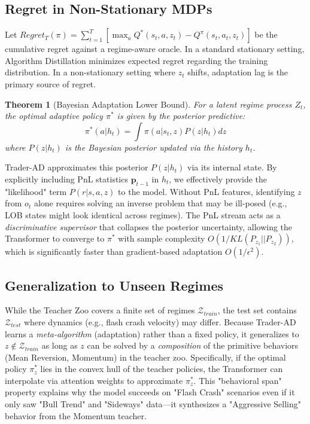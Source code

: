 \documentclass{article}
\newtheorem{theorem}{Theorem}
\begin{document}
\subsection{Regret in Non-Stationary MDPs}
Let $Regret_T(\pi) = \sum_{t=1}^T [ \max_{a} Q^*(s_t, a, z_t) - Q^{\pi}(s_t, a_t, z_t) ]$ be the cumulative regret against a regime-aware oracle. In a standard stationary setting, Algorithm Distillation minimizes expected regret regarding the training distribution.
In a non-stationary setting where $z_t$ shifts, adaptation lag is the primary source of regret.
\begin{theorem}[Bayesian Adaptation Lower Bound]
For a latent regime process $Z_t$, the optimal adaptive policy $\pi^*$ is given by the posterior predictive:
\begin{equation}
    \pi^*(a|h_t) = \int \pi(a|s_t, z) P(z|h_t) dz
\end{equation}
where $P(z|h_t)$ is the Bayesian posterior updated via the history $h_t$.
\end{theorem}
Trader-AD approximates this posterior $P(z|h_t)$ via its internal state. By explicitly including PnL statistics $\mathbf{p}_{t-1}$ in $h_t$, we effectively provide the "likelihood" term $P(r | s, a, z)$ to the model. Without PnL features, identifying $z$ from $o_t$ alone requires solving an inverse problem that may be ill-posed (e.g., LOB states might look identical across regimes). The PnL stream acts as a \emph{discriminative supervisor} that collapses the posterior uncertainty, allowing the Transformer to converge to $\pi^*$ with sample complexity $O(1/KL(P_{z_1} || P_{z_2}))$, which is significantly faster than gradient-based adaptation $O(1/\epsilon^2)$.

\subsection{Generalization to Unseen Regimes}
While the Teacher Zoo covers a finite set of regimes $\mathcal{Z}_{train}$, the test set contains $\mathcal{Z}_{test}$ where dynamics (e.g., flash crash velocity) may differ.
Because Trader-AD learns a \emph{meta-algorithm} (adaptation) rather than a fixed policy, it generalizes to $z \notin \mathcal{Z}_{train}$ as long as $z$ can be solved by a \emph{composition} of the primitive behaviors (Mean Reversion, Momentum) in the teacher zoo. Specifically, if the optimal policy $\pi^*_z$ lies in the convex hull of the teacher policies, the Transformer can interpolate via attention weights to approximate $\pi^*_z$. This "behavioral span" property explains why the model succeeds on "Flash Crash" scenarios even if it only saw "Bull Trend" and "Sideways" data—it synthesizes a "Aggressive Selling" behavior from the Momentum teacher.
\end{document}
